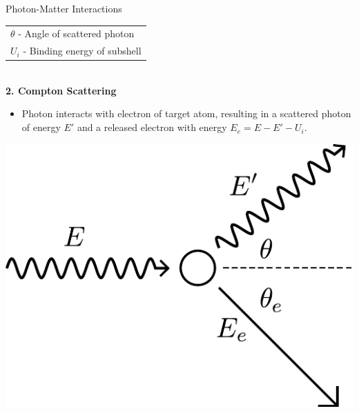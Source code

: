\documentclass[final]{beamer}
\newlength{\colwidth}
\begin{document}
\begin{frame}[t]
\begin{columns}[t]
\begin{column}{\colwidth}
\begin{block}{Photon-Matter Interactions}
\begin{multicols}{2}
      \begin{center}
          \begin{tabular}{@{\extracolsep{\fill}}l}
            $\theta$ - Angle of scattered photon \\
            $U_i$ - Binding energy of subshell\\
          \end{tabular}
          \vspace{\baselineskip} \\
          \textbf{2. Compton Scattering}
          \begin{itemize}
              \item Photon interacts with electron of target atom, resulting in a scattered photon of energy $E'$ and a released electron with energy $E_e = E - E' - U_i$.
          \end{itemize}
      \end{center}
      \vfill %
      \begin{center}
          \includegraphics[width=0.8\linewidth]{compton_diagram.pdf} %
      \end{center}
  \end{multicols}


\end{block}
\end{column}
\end{columns}
\end{frame}
\end{document}
